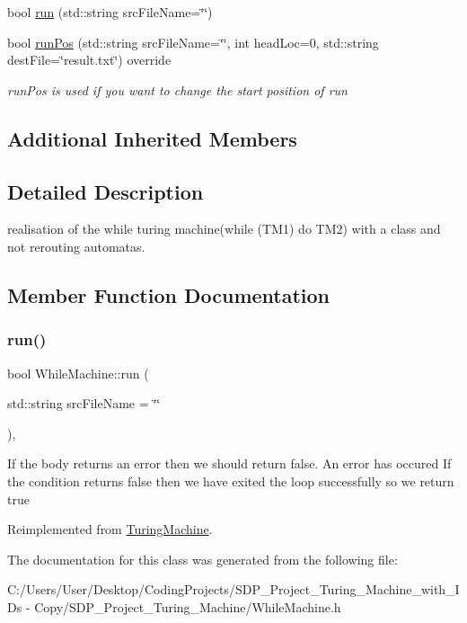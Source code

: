 \begin{DoxyCompactItemize}
bool \mbox{\hyperlink{class_while_machine_a63d981ab54e728345051cce59198c3c6}{run}} (std\+::string src\+File\+Name=\char`\"{}\char`\"{})
\item 
\mbox{\label{class_while_machine_afd3e97cecf251c425baaa40292d4687b}} 
bool \mbox{\hyperlink{class_while_machine_afd3e97cecf251c425baaa40292d4687b}{run\+Pos}} (std\+::string src\+File\+Name=\char`\"{}\char`\"{}, int head\+Loc=0, std\+::string dest\+File=\char`\"{}result.\+txt\char`\"{}) override
\begin{DoxyCompactList}\small\item\em run\+Pos is used if you want to change the start position of run \end{DoxyCompactList}\end{DoxyCompactItemize}
\subsection*{Additional Inherited Members}


\subsection{Detailed Description}
realisation of the while turing machine(while (\+T\+M1) do T\+M2) with a class and not rerouting automatas. 

\subsection{Member Function Documentation}
\mbox{\label{class_while_machine_a63d981ab54e728345051cce59198c3c6}} 
\subsubsection{\texorpdfstring{run()}{run()}}
{\footnotesize\ttfamily bool While\+Machine\+::run (\begin{DoxyParamCaption}\item[{std\+::string}]{src\+File\+Name = {\ttfamily \char`\"{}\char`\"{}} }\end{DoxyParamCaption})\hspace{0.3cm}{\ttfamily [inline]}, {\ttfamily [virtual]}}

If the body returns an error then we should return false. An error has occured If the condition returns false then we have exited the loop successfully so we return true 

Reimplemented from \mbox{\hyperlink{class_turing_machine}{Turing\+Machine}}.



The documentation for this class was generated from the following file\+:\begin{DoxyCompactItemize}
\item 
C\+:/\+Users/\+User/\+Desktop/\+Coding\+Projects/\+S\+D\+P\+\_\+\+Project\+\_\+\+Turing\+\_\+\+Machine\+\_\+with\+\_\+\+I\+Ds -\/ Copy/\+S\+D\+P\+\_\+\+Project\+\_\+\+Turing\+\_\+\+Machine/While\+Machine.\+h\end{DoxyCompactItemize}
